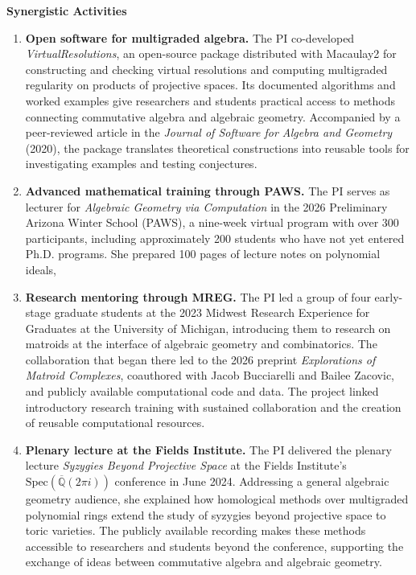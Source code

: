 \documentclass[12pt,letterpaper]{article}
\begin{document}
\begin{center}
  {\large\bfseries Synergistic Activities}\\[4pt]
\end{center}
\vspace{2pt}

\begin{enumerate}[label=\textbf{\arabic*.},leftmargin=0.22in,
                  labelsep=0.07in,itemsep=9pt,topsep=0pt,parsep=0pt]

\item \textbf{Open software for multigraded algebra.}
The PI co-developed \mbox{\textit{VirtualResolutions}}, an open-source package distributed with Macaulay2 for constructing and checking virtual resolutions and computing multigraded regularity on products of projective spaces. Its documented algorithms and worked examples give researchers and students practical access to methods connecting commutative algebra and algebraic geometry. Accompanied by a peer-reviewed article in the \textit{Journal of Software for Algebra and Geometry} (2020), the package translates theoretical constructions into reusable tools for investigating examples and testing conjectures.

\item \textbf{Advanced mathematical training through PAWS.}
The PI serves as lecturer for \textit{Algebraic Geometry via Computation} in the 2026 Preliminary Arizona Winter School (PAWS), a nine-week virtual program with over 300 participants, including approximately 200 students who have not yet entered Ph.D. programs. She prepared 100 pages of lecture notes on polynomial ideals,

\item \textbf{Research mentoring through MREG.}
The PI led a group of four early-stage graduate students at the 2023 Midwest Research Experience for Graduates at the University of Michigan, introducing them to research on matroids at the interface of algebraic geometry and combinatorics. The collaboration that began there led to the 2026 preprint \textit{Explorations of Matroid Complexes}, coauthored with Jacob Bucciarelli and Bailee Zacovic, and publicly available computational code and data. The project linked introductory research training with sustained collaboration and the creation of reusable computational resources.

\item \textbf{Plenary lecture at the Fields Institute.}
The PI delivered the plenary lecture \textit{Syzygies Beyond Projective Space} at the Fields Institute's \(\mathrm{Spec}(\overline{\mathbb{Q}}(2\pi i))\) conference in June 2024. Addressing a general algebraic geometry audience, she explained how homological methods over multigraded polynomial rings extend the study of syzygies beyond projective space to toric varieties. The publicly available recording makes these methods accessible to researchers and students beyond the conference, supporting the exchange of ideas between commutative algebra and algebraic geometry.


\end{enumerate}
\end{document}
